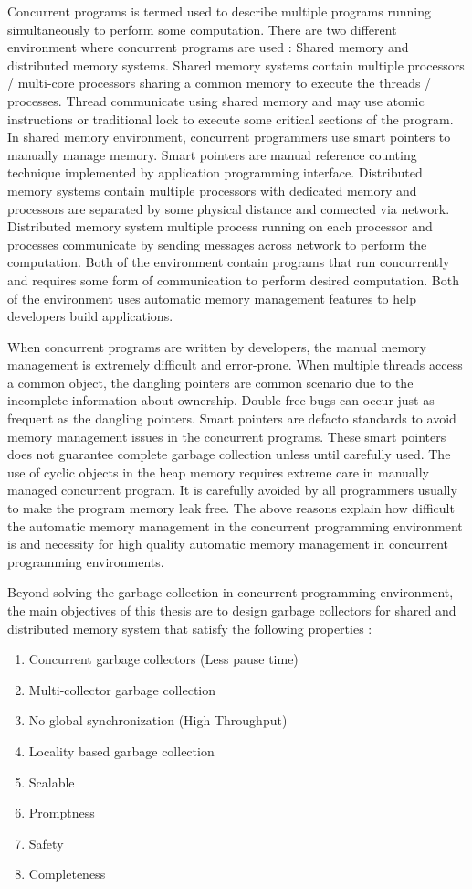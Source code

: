 Concurrent programs is termed used to describe multiple programs running simultaneously to perform some computation. There are two different environment where concurrent programs are used : Shared memory and distributed memory systems. Shared memory systems contain multiple processors / multi-core processors sharing a common memory to execute the threads / processes. Thread communicate using shared memory and may use atomic instructions or traditional lock to execute some critical sections of the program. 
In shared memory environment, concurrent programmers use smart pointers to manually manage memory. Smart pointers are manual reference counting technique implemented by application programming interface. Distributed memory systems contain multiple processors with dedicated memory and processors are separated by some physical distance and connected via network. Distributed memory system multiple process running on each processor and processes communicate by sending messages across network to perform the computation. Both of the environment contain programs that run concurrently and requires some form of communication to perform desired computation. Both of the environment uses automatic memory management features to help developers build applications. 

When concurrent programs are written by developers, the manual memory management is extremely difficult and error-prone. When multiple threads access a common object, the dangling pointers are common scenario due to the incomplete information about ownership. Double free bugs can occur just as frequent as the dangling pointers. Smart pointers are defacto standards to avoid memory management issues in the concurrent programs. These smart pointers does not guarantee complete garbage collection unless until carefully used. The use of cyclic objects in the heap memory requires extreme care in manually managed concurrent program. It is carefully avoided by all programmers usually to make the program memory leak free. The above reasons explain how difficult the automatic memory management in the concurrent programming environment is and necessity for high quality automatic memory management in concurrent programming environments. 

Beyond solving the garbage collection in concurrent programming environment, the main objectives of this thesis are to design garbage collectors for shared and distributed memory system that satisfy the following properties :
\begin{enumerate}
	\item Concurrent garbage collectors (Less pause time)
	\item Multi-collector garbage collection
	\item No global synchronization (High Throughput)
	\item Locality based garbage collection
	\item Scalable
	\item Promptness
	\item Safety
	\item Completeness
\end{enumerate}

